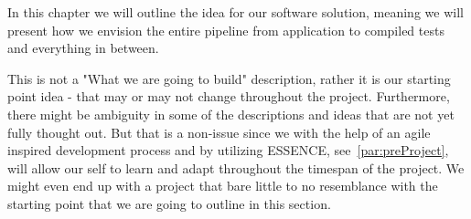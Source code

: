 In this chapter we will outline the idea for our software solution, meaning we will present how we envision the entire pipeline from application to compiled tests and everything in between.

This is not a "What we are going to build" description, rather it is our starting point idea - that may or may not change throughout the project.
Furthermore, there might be ambiguity in some of the descriptions and ideas that are not yet fully thought out.
But that is a non-issue since we with the help of an agile inspired development process and by utilizing ESSENCE, see~\autoref{par:preProject}, will allow our self to learn and adapt throughout the timespan of the project.
We might even end up with a project that bare little to no resemblance with the starting point that we are going to outline in this section.
